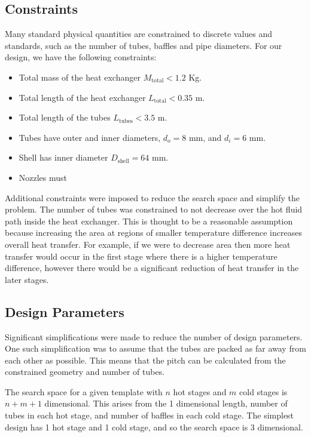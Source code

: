 \documentclass{article}
\begin{document}
\subsection{Constraints}

Many standard physical quantities are constrained to discrete values and standards, such as the number of tubes, baffles and pipe diameters.
For our design, we have the following constraints:
\begin{itemize}
  \item Total mass of the heat exchanger $M_{\text{total}} < 1.2$ Kg.
  \item Total length of the heat exchanger $L_{\text{total}} < 0.35$ m.
  \item Total length of the tubes $L_{\text{tubes}} < 3.5$ m.
  \item Tubes have outer and inner diameters, $d_{o} = 8$ mm, and $d_{i} = 6$ mm.
  \item Shell has inner diameter $D_{\text{shell}} = 64$ mm.
  \item Nozzles must 
\end{itemize}

Additional constraints were imposed to reduce the search space and simplify the problem.
The number of tubes was constrained to not decrease over the hot fluid path inside the heat exchanger.
This is thought to be a reasonable assumption because increasing the area at regions of smaller temperature difference increases overall heat transfer.
For example, if we were to decrease area then more heat transfer would occur in the first stage where there is a higher temperature difference, however there would be a significant reduction of heat transfer in the later stages.

\subsection{Design Parameters}

Significant simplifications were made to reduce the number of design parameters.
One such simplification was to assume that the tubes are packed as far away from each other as possible.
This means that the pitch can be calculated from the constrained geometry and number of tubes.

The search space for a given template with $n$ hot stages and $m$ cold stages is $n + m + 1$ dimensional.
This arises from the 1 dimensional length, number of tubes in each hot stage, and number of baffles in each cold stage.
The simplest design has 1 hot stage and 1 cold stage, and so the search space is 3 dimensional.
\end{document}
